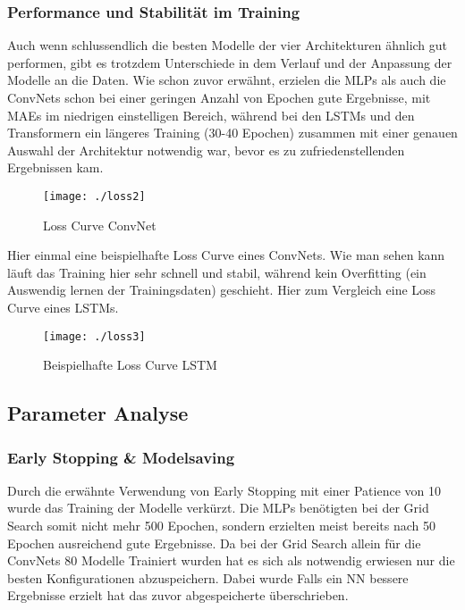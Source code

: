 \documentclass[acmtog, authorversion]{acmart} %
\begin{document}
\subsubsection{Performance und Stabilität im Training}
Auch wenn schlussendlich die besten Modelle der vier Architekturen ähnlich gut performen, gibt es trotzdem Unterschiede in dem Verlauf und der Anpassung der Modelle an die Daten. Wie schon zuvor erwähnt, erzielen die MLPs als auch die ConvNets schon bei einer geringen Anzahl von Epochen gute Ergebnisse, mit MAEs im niedrigen einstelligen Bereich, während bei den LSTMs und den Transformern ein längeres Training (30-40 Epochen) zusammen mit einer genauen Auswahl der Architektur notwendig war, bevor es zu zufriedenstellenden Ergebnissen kam.
\begin{figure}[H]
    \centering
    \texttt{[image: ./loss2]}
    \label{fig:sub7}
    \caption{Loss Curve ConvNet}
\end{figure}
Hier einmal eine beispielhafte Loss Curve eines ConvNets. Wie man sehen kann läuft das Training hier sehr schnell und stabil, während kein Overfitting (ein Auswendig lernen der Trainingsdaten) geschieht.
Hier zum Vergleich eine Loss Curve eines LSTMs.
\begin{figure}[H]
    \centering
    \texttt{[image: ./loss3]}
    \label{fig:sub7}
    \caption{Beispielhafte Loss Curve LSTM}
\end{figure}


\subsection{Parameter Analyse}

\subsubsection{Early Stopping \& Modelsaving}
Durch die erwähnte Verwendung von Early Stopping mit einer Patience von 10 wurde das Training der Modelle verkürzt. 
Die MLPs benötigten bei der Grid Search somit nicht mehr 500 Epochen, sondern erzielten meist bereits nach 50 Epochen ausreichend gute Ergebnisse. 
Da bei der Grid Search allein für die ConvNets 80 Modelle Trainiert wurden hat es sich als notwendig erwiesen nur die besten Konfigurationen abzuspeichern. Dabei wurde Falls ein NN bessere Ergebnisse erzielt hat das zuvor abgespeicherte überschrieben. 
\end{document}

